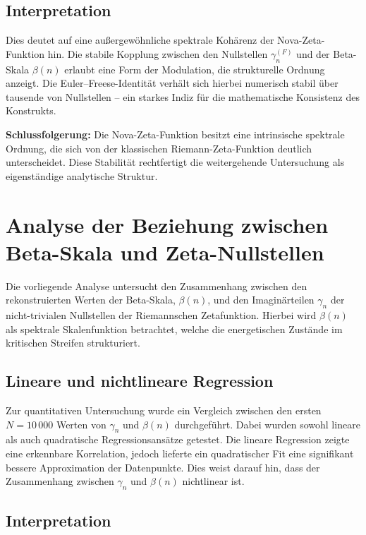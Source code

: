 \documentclass[12pt]{article}
\begin{document}
\subsection*{Interpretation}

Dies deutet auf eine außergewöhnliche spektrale Kohärenz der Nova-Zeta-Funktion hin. Die stabile Kopplung zwischen den Nullstellen $\gamma_n^{(F)}$ und der Beta-Skala $\beta(n)$ erlaubt eine Form der Modulation, die strukturelle Ordnung anzeigt. Die Euler–Freese-Identität verhält sich hierbei numerisch stabil über tausende von Nullstellen -- ein starkes Indiz für die mathematische Konsistenz des Konstrukts.

\textbf{Schlussfolgerung:} Die Nova-Zeta-Funktion besitzt eine intrinsische spektrale Ordnung, die sich von der klassischen Riemann-Zeta-Funktion deutlich unterscheidet. Diese Stabilität rechtfertigt die weitergehende Untersuchung als eigenständige analytische Struktur.

\section*{Analyse der Beziehung zwischen Beta-Skala und Zeta-Nullstellen}

Die vorliegende Analyse untersucht den Zusammenhang zwischen den rekonstruierten Werten der Beta-Skala, \(\beta(n)\), und den Imaginärteilen \(\gamma_n\) der nicht-trivialen Nullstellen der Riemannschen Zetafunktion. Hierbei wird \(\beta(n)\) als spektrale Skalenfunktion betrachtet, welche die energetischen Zustände im kritischen Streifen strukturiert.

\subsection*{Lineare und nichtlineare Regression}

Zur quantitativen Untersuchung wurde ein Vergleich zwischen den ersten \(N = 10\,000\) Werten von \(\gamma_n\) und \(\beta(n)\) durchgeführt. Dabei wurden sowohl lineare als auch quadratische Regressionsansätze getestet. Die lineare Regression zeigte eine erkennbare Korrelation, jedoch lieferte ein quadratischer Fit eine signifikant bessere Approximation der Datenpunkte. Dies weist darauf hin, dass der Zusammenhang zwischen \(\gamma_n\) und \(\beta(n)\) nichtlinear ist.

\subsection*{Interpretation}
\end{document}
